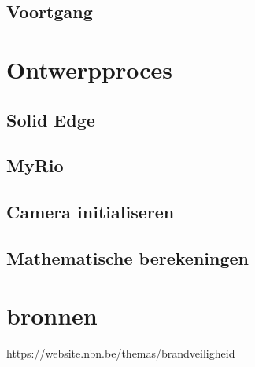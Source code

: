 \documentclass{kulakarticle}
\begin{document}
\subsection{Voortgang}



\section{Ontwerpproces}

\subsection{Solid Edge}

\subsection{MyRio}


\subsection{Camera initialiseren}

\subsection{Mathematische berekeningen}


 

\section*{bronnen}
https://website.nbn.be/themas/brandveiligheid
\end{document}
